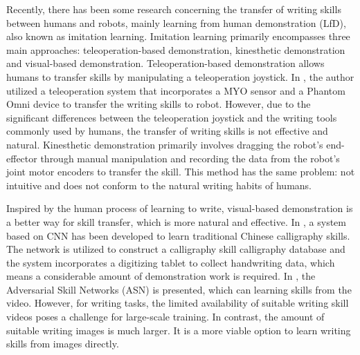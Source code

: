\documentclass[conference]{IEEEtran}
\begin{document}
Recently, there has been some research concerning the transfer of writing skills between humans and robots, mainly learning from human demonstration (LfD), also known as imitation learning. Imitation learning primarily encompasses three main approaches: teleoperation-based demonstration, kinesthetic demonstration and visual-based demonstration. Teleoperation-based demonstration  allows humans to transfer skills by manipulating a teleoperation joystick. In \cite{Yang2015}, the author utilized a teleoperation system that incorporates a MYO sensor and a Phantom Omni device to transfer the writing skills to robot. However, due to the significant differences between the teleoperation joystick and the writing tools commonly used by humans, the transfer of writing skills is not effective and natural. Kinesthetic demonstration primarily involves dragging the robot's end-effector through manual manipulation and recording the data from the robot's joint motor encoders to transfer the skill. This method has the same problem: not intuitive and does not conform to the natural writing habits of humans. 

Inspired by the human process of learning to write, visual-based demonstration is a better way for skill transfer, which is more natural and effective. In \cite{Zhang2019}, a system based on CNN has been developed to learn traditional Chinese calligraphy skills. The network is utilized to construct a calligraphy skill calligraphy database and the system incorporates a digitizing tablet to collect handwriting data, which means a considerable amount of demonstration work is required. In \cite{Mees2020}, the Adversarial Skill Networks (ASN) is presented, which can learning skills from the video. However, for writing tasks, the limited availability of suitable writing skill videos poses a challenge for large-scale training. In contrast, the amount of suitable writing images is much larger. It is a more viable option to learn writing skills from images directly.
\end{document}

